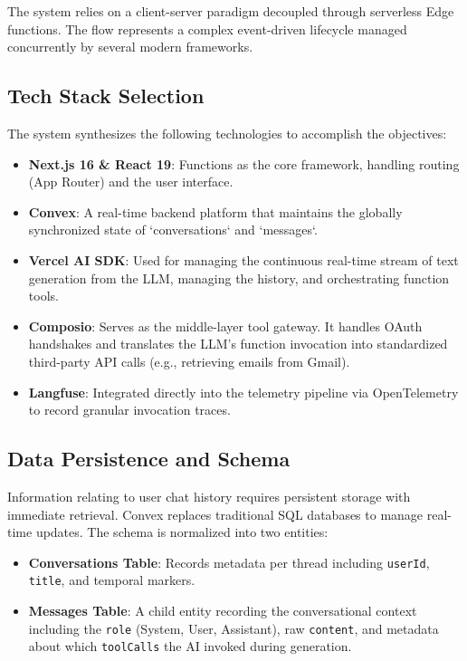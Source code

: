 \documentclass[12pt,a4paper]{article}
\begin{document}
The system relies on a client-server paradigm decoupled through serverless Edge functions. The flow represents a complex event-driven lifecycle managed concurrently by several modern frameworks.

\subsection{Tech Stack Selection}
The system synthesizes the following technologies to accomplish the objectives:
\begin{itemize}
    \item \textbf{Next.js 16 \& React 19}: Functions as the core framework, handling routing (App Router) and the user interface.
    \item \textbf{Convex}: A real-time backend platform that maintains the globally synchronized state of `conversations` and `messages`.
    \item \textbf{Vercel AI SDK}: Used for managing the continuous real-time stream of text generation from the LLM, managing the history, and orchestrating function tools.
    \item \textbf{Composio}: Serves as the middle-layer tool gateway. It handles OAuth handshakes and translates the LLM's function invocation into standardized third-party API calls (e.g., retrieving emails from Gmail).
    \item \textbf{Langfuse}: Integrated directly into the telemetry pipeline via OpenTelemetry to record granular invocation traces.
\end{itemize}

\subsection{Data Persistence and Schema}
Information relating to user chat history requires persistent storage with immediate retrieval. Convex replaces traditional SQL databases to manage real-time updates. The schema is normalized into two entities:
\begin{itemize}
    \item \textbf{Conversations Table}: Records metadata per thread including \texttt{userId}, \texttt{title}, and temporal markers.
    \item \textbf{Messages Table}: A child entity recording the conversational context including the \texttt{role} (System, User, Assistant), raw \texttt{content}, and metadata about which \texttt{toolCalls} the AI invoked during generation.
\end{itemize}
\end{document}
